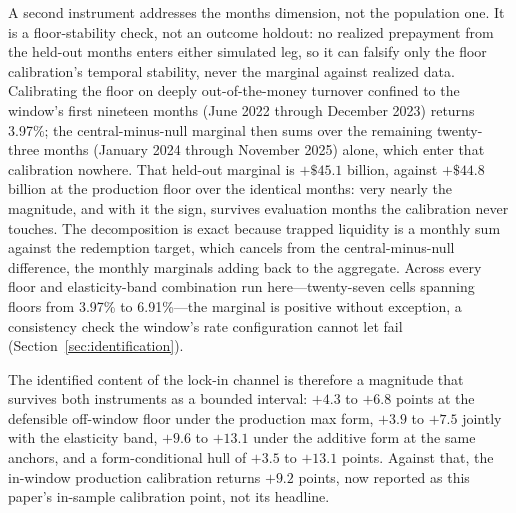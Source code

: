 A second instrument addresses the months dimension, not the population one. It is a floor-stability check, not an outcome holdout: no realized prepayment from the held-out months enters either simulated leg, so it can falsify only the floor calibration's temporal stability, never the marginal against realized data. Calibrating the floor on deeply out-of-the-money turnover confined to the window's first nineteen months (June 2022 through December 2023) returns 3.97\%; the central-minus-null marginal then sums over the remaining twenty-three months (January 2024 through November 2025) alone, which enter that calibration nowhere. That held-out marginal is $+\$45.1$ billion, against $+\$44.8$ billion at the production floor over the identical months: very nearly the magnitude, and with it the sign, survives evaluation months the calibration never touches. The decomposition is exact because trapped liquidity is a monthly sum against the redemption target, which cancels from the central-minus-null difference, the monthly marginals adding back to the aggregate. Across every floor and elasticity-band combination run here---twenty-seven cells spanning floors from 3.97\% to 6.91\%---the marginal is positive without exception, a consistency check the window's rate configuration cannot let fail (Section~\ref{sec:identification}).

The identified content of the lock-in channel is therefore a magnitude that survives both instruments as a bounded interval: $+4.3$ to $+6.8$ points at the defensible off-window floor under the production max form, $+3.9$ to $+7.5$ jointly with the elasticity band, $+9.6$ to $+13.1$ under the additive form at the same anchors, and a form-conditional hull of $+3.5$ to $+13.1$ points. Against that, the in-window production calibration returns $+9.2$ points, now reported as this paper's in-sample calibration point, not its headline.
